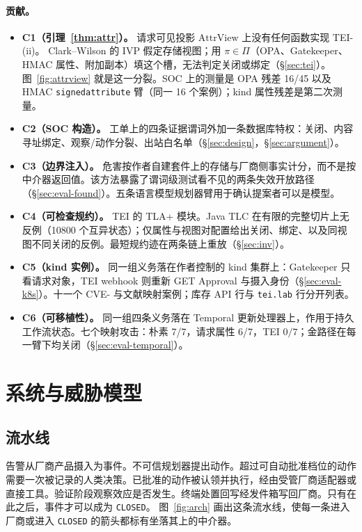 \documentclass[acmsmall,manuscript,review,anonymous]{acmart}
\renewcommand{\_}{\discretionary{\textunderscore}{}{\textunderscore}}
\begin{document}
\paragraph{贡献。}
\begin{itemize}
  \item \textbf{C1（引理~\ref{thm:attr}）。} 请求可见投影 $\mathrm{AttrView}$ 上没有任何函数实现 TEI-(ii)。
  Clark--Wilson 的 {IVP} 假定存储视图；用 $\pi\in\Pi$（{OPA}、Gatekeeper、{HMAC} 属性、附加副本）填这个槽，无法判定关闭或绑定（\S\ref{sec:tei}）。
  图~\ref{fig:attrview} 就是这一分裂。{SOC} 上的测量是 {OPA} 残差 16/45 以及 {HMAC} \texttt{signed\_attribute} 臂（同一 16 个案例）；kind 属性残差是第二次测量。
  \item \textbf{C2（SOC 构造）。} 工单上的四条证据谓词外加一条数据库特权：关闭、内容寻址绑定、观察/动作分裂、出站白名单（\S\ref{sec:design}，\S\ref{sec:argument}）。
  \item \textbf{C3（边界注入）。} 危害按作者自建套件上的存储与厂商侧事实计分，而不是按中介器返回值。该方法暴露了谓词级测试看不见的两条失效开放路径（\S\ref{sec:eval-found}）。五条语言模型规划器臂用于确认提案者可以是模型。
  \item \textbf{C4（可检查规约）。} {TEI} 的 {TLA+} 模块。Java {TLC} 在有限的完整切片上无反例（10800 个互异状态）；仅属性与视图对配置给出关闭、绑定、以及同视图不同关闭的反例。最短规约迹在两条链上重放（\S\ref{sec:inv}）。
  \item \textbf{C5（kind 实例）。} 同一组义务落在作者控制的 kind 集群上：Gatekeeper 只看请求对象，{TEI} webhook 则重新 {GET} Approval 与摄入身份（\S\ref{sec:eval-k8s}）。十一个 {CVE}- 与文献映射案例；库存 {API} 行与 \texttt{tei.lab} 行分开列表。
  \item \textbf{C6（可移植性）。} 同一组四条义务落在 {Temporal} 更新处理器上，作用于持久工作流状态。七个映射攻击：朴素 7/7，请求属性 6/7，{TEI} $0/7$；金路径在每一臂下均关闭（\S\ref{sec:eval-temporal}）。
\end{itemize}

\section{系统与威胁模型}
\label{sec:threat}

\subsection{流水线}

告警从厂商产品摄入为事件。不可信规划器提出动作。超过可自动批准档位的动作需要一次被记录的人类决策。已批准的动作被认领并执行，经由受管厂商适配器或直接工具。验证阶段观察效应是否发生。终端处置回写经发件箱写回厂商。只有在此之后，事件才可以成为 \texttt{CLOSED}。
图~\ref{fig:arch} 画出这条流水线，使每一条进入厂商或进入 \texttt{CLOSED} 的箭头都标有坐落其上的中介器。
\end{document}
